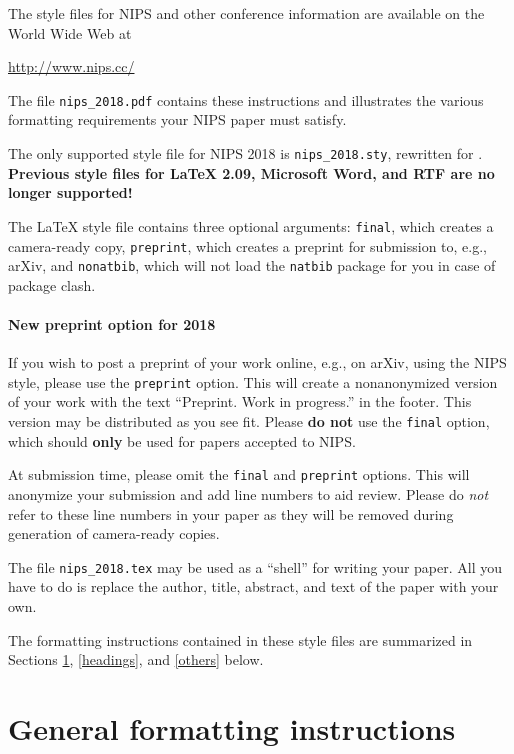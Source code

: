 \documentclass{article}
\begin{document}
	The style files for NIPS and other conference information are
	available on the World Wide Web at
	\begin{center}
		\url{http://www.nips.cc/}
	\end{center}
	The file \verb+nips_2018.pdf+ contains these instructions and
	illustrates the various formatting requirements your NIPS paper must
	satisfy.
	
	The only supported style file for NIPS 2018 is \verb+nips_2018.sty+,
	rewritten for \LaTeXe{}.  \textbf{Previous style files for \LaTeX{}
		2.09, Microsoft Word, and RTF are no longer supported!}
	
	The \LaTeX{} style file contains three optional arguments: \verb+final+,
	which creates a camera-ready copy, \verb+preprint+, which creates a
	preprint for submission to, e.g., arXiv, and \verb+nonatbib+, which will
	not load the \verb+natbib+ package for you in case of package clash.
	
	\paragraph{New preprint option for 2018}
	If you wish to post a preprint of your work online, e.g., on arXiv,
	using the NIPS style, please use the \verb+preprint+ option. This will
	create a nonanonymized version of your work with the text
	``Preprint. Work in progress.''  in the footer. This version may be
	distributed as you see fit. Please \textbf{do not} use the
	\verb+final+ option, which should \textbf{only} be used for papers
	accepted to NIPS.
	
	At submission time, please omit the \verb+final+ and \verb+preprint+
	options. This will anonymize your submission and add line numbers to aid
	review. Please do \emph{not} refer to these line numbers in your paper
	as they will be removed during generation of camera-ready copies.
	
	The file \verb+nips_2018.tex+ may be used as a ``shell'' for writing
	your paper. All you have to do is replace the author, title, abstract,
	and text of the paper with your own.
	
	The formatting instructions contained in these style files are
	summarized in Sections \ref{gen_inst}, \ref{headings}, and
	\ref{others} below.
	
	\section{General formatting instructions}
	\label{gen_inst}
	
\end{document}
